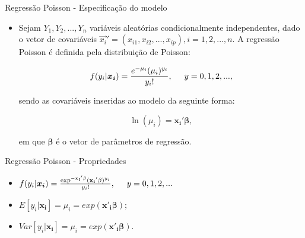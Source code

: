 \documentclass[10pt, aspectratio=169]{beamer}
\begin{document}


\begin{frame}{Regressão Poisson - Especificação do modelo} 

\begin{itemize}
    \item Sejam $Y_{1},Y_{2},...,Y_{n}$ variáveis aleatórias condicionalmente independentes, dado o vetor de covariáveis ${\vec{x_{i}}}'=(x_{i1},x_{i2},...,x_{ip}), i=1,2,...,n$. A regressão Poisson é definida pela distribuição de Poisson:


$$
   f(y_{i}|\boldsymbol{x_{i}})=\frac{e^{-\mu_{i}}(\mu_{i})^{y_{i}}}{y_{i}!},\hspace{5mm}y=0,1,2,...,
$$

\vspace{0,2cm}
 
sendo as covariáveis inseridas ao modelo da seguinte forma:

$$
\ln(\mu _{i})=\boldsymbol{x_{i}'} \boldsymbol{\beta},
$$

\vspace{0,2cm}
 
em que ${\boldsymbol{\beta }}$ é o vetor de parâmetros de regressão.
 

\end{itemize}

\end{frame}




\begin{frame}{Regressão Poisson - Propriedades} 


\vspace{0,8cm}  
    
    \begin{itemize}
        
        \item $f(y_{i}|\boldsymbol{x_{i}})=\frac{\exp^{- \vec{{x_{i}}' \beta}}( \vec{{x_{i}}' \beta})^{y_{i}}}{y_{i}!},\hspace{5mm}y=0,1,2,...$

  
  \vspace{0,8cm}  

        
        \item $E\left [ y_{i}|\boldsymbol{x_{i}} \right ]= \mu_{i}=exp\left ( \boldsymbol{x'_{i}\beta} \right );$

\vspace{0,8cm}  
   
        \item $Var\left [ y_{i}|\mathbf{x_{i}} \right ]= \mu_{i}=exp\left ( \boldsymbol{x'_{i}\beta} \right ).$
    

    
    
\end{itemize}

\end{frame}
\end{document}
